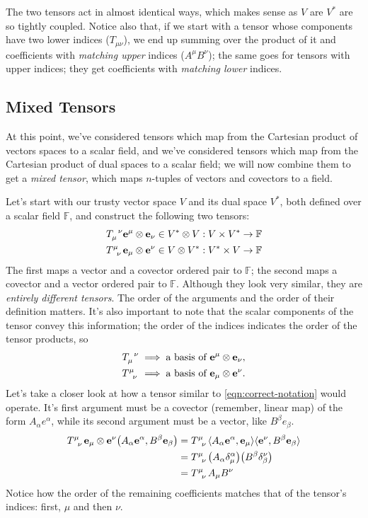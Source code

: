The two tensors act in almost identical ways, which makes sense as $V$ are $V^*$ are so tightly coupled.
Notice also that, if we start with a tensor whose components have two lower indices ($T_{\mu\nu}$), we end up summing over the product of it and coefficients with \emph{matching upper} indices ($A^\mu B^\nu$); the same goes for tensors with upper indices; they get coefficients with \emph{matching lower} indices.

\subsection{Mixed Tensors}
At this point, we've considered tensors which map from the Cartesian product of vectors spaces to a scalar field, and we've considered tensors which map from the Cartesian product of dual spaces to a scalar field; we will now combine them to get a \emph{mixed tensor}, which maps $n$-tuples of vectors and covectors to a field.

Let's start with our trusty vector space $V$ and its dual space $V^*$, both defined over a scalar field $\mathbb{F}$, and construct the following two tensors:
\begin{align}
    \tensor{T}{_{\mu}^\nu} \vec{e}^\mu \otimes \vec{e}_\nu \in V^* \otimes V : V \times V^* \to \mathbb{F} \\
    \tensor{T}{^{\mu}_{\nu}} \vec{e}_\mu \otimes \vec{e}^\nu \in V \otimes V^* : V^* \times V \to \mathbb{F}\label{eqn:correct-notation}
\end{align}
The first maps a vector and a covector ordered pair to $\mathbb{F}$; the second maps a covector and a vector ordered pair to $\mathbb{F}$.
Although they look very similar, they are \emph{entirely different tensors}.
The order of the arguments and the order of their definition matters.
It's also important to note that the scalar components of the tensor convey this information; the order of the indices indicates the order of the tensor products, so
\begin{align*}
    \tensor{T}{_{\mu}^\nu} \implies \text{a basis of }\vec{e}^\mu \otimes \vec{e}_\nu, \\
    \tensor{T}{^{\mu}_\nu} \implies \text{a basis of }\vec{e}_\mu \otimes \vec{e}^\nu.
\end{align*}
Let's take a closer look at how a tensor similar to \eqref{eqn:correct-notation} would operate.
It's first argument must be a covector (remember, linear map) of the form $A_\alpha e^\alpha$, while its second argument must be a vector, like $B^\beta e_\beta$.
\begin{align*}
    \tensor{T}{^{\mu}_{\nu}} \vec{e}_\mu \otimes \vec{e}^\nu \qty(A_\alpha \vec{e}^\alpha, B^\beta \vec{e}_\beta) &= \tensor{T}{^{\mu}_{\nu}} \langle A_\alpha \vec{e}^\alpha, \vec{e}_\mu \rangle \langle \vec{e}^\nu, B^\beta \vec{e}_\beta \rangle \\
    &= \tensor{T}{^{\mu}_{\nu}} \qty(A_\alpha \delta^\alpha_\mu) \qty(B^\beta \delta_\beta^\nu) \\
    &= \tensor{T}{^{\mu}_{\nu}} A_\mu B^\nu
\end{align*}
Notice how the order of the remaining coefficients matches that of the tensor's indices: first, $\mu$ and then $\nu$.
